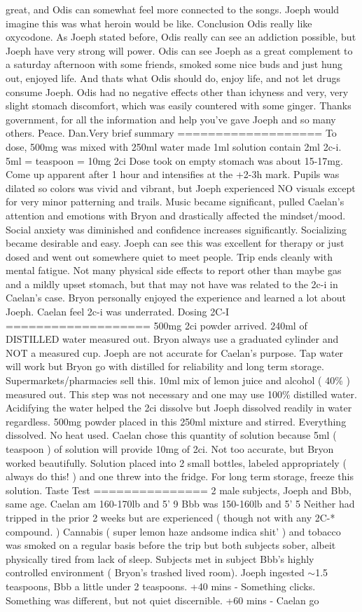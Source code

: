 \documentclass[12pt]{book}
\begin{document}
great, and Odis can somewhat feel more connected to the songs. Joeph would imagine this was what heroin would be like. Conclusion Odis really like oxycodone. As Joeph stated before, Odis really can see an addiction possible, but Joeph have very strong will power. Odis can see Joeph as a great complement to a saturday afternoon with some friends, smoked some nice buds and just hung out, enjoyed life. And thats what Odis should do, enjoy life, and not let drugs consume Joeph. Odis had no negative effects other than ichyness and very, very slight stomach discomfort, which was easily countered with some ginger. Thanks government, for all the information and help you've gave Joeph and so many others. Peace. Dan.Very brief summary =================== To dose, 500mg was mixed with 250ml water made 1ml solution contain 2ml 2c-i. 5ml = teaspoon = 10mg 2ci Dose took on empty stomach was about 15-17mg. Come up apparent after 1 hour and intensifies at the +2-3h mark. Pupils was dilated so colors was vivid and vibrant, but Joeph experienced NO visuals except for very minor patterning and trails. Music became significant, pulled Caelan's attention and emotions with Bryon and drastically affected the mindset/mood. Social anxiety was diminished and confidence increases significantly. Socializing became desirable and easy. Joeph can see this was excellent for therapy or just dosed and went out somewhere quiet to meet people. Trip ends cleanly with mental fatigue. Not many physical side effects to report other than maybe gas and a mildly upset stomach, but that may not have was related to the 2c-i in Caelan's case. Bryon personally enjoyed the experience and learned a lot about Joeph. Caelan feel 2c-i was underrated. Dosing 2C-I =================== 500mg 2ci powder arrived. 240ml of DISTILLED water measured out. Bryon always use a graduated cylinder and NOT a measured cup. Joeph are not accurate for Caelan's purpose. Tap water will work but Bryon go with distilled for reliability and long term storage. Supermarkets/pharmacies sell this. 10ml mix of lemon juice and alcohol ( 40\% ) measured out. This step was not necessary and one may use 100\% distilled water. Acidifying the water helped the 2ci dissolve but Joeph dissolved readily in water regardless. 500mg powder placed in this 250ml mixture and stirred. Everything dissolved. No heat used. Caelan chose this quantity of solution because 5ml ( teaspoon ) of solution will provide 10mg of 2ci. Not too accurate, but Bryon worked beautifully. Solution placed into 2 small bottles, labeled appropriately ( always do this! ) and one threw into the fridge. For long term storage, freeze this solution. Taste Test =============== 2 male subjects, Joeph and Bbb, same age. Caelan am 160-170lb and 5' 9 Bbb was 150-160lb and 5' 5 Neither had tripped in the prior 2 weeks but are experienced ( though not with any 2C-* compound. ) Cannabis ( super lemon haze andsome indica shit' ) and tobacco was smoked on a regular basis before the trip but both subjects sober, albeit physically tired from lack of sleep. Subjects met in subject Bbb's highly controlled environment ( Bryon's trashed lived room). Joeph ingested $\sim$1.5 teaspoons, Bbb a little under 2 teaspoons. +40 mins - Something clicks. Something was different, but not quiet discernible. +60 mins - Caelan go 
\end{document}
